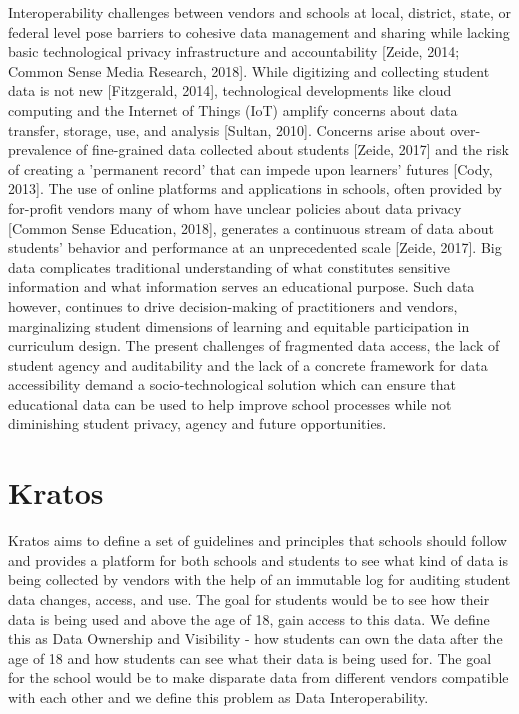 \documentclass{article}
\begin{document}
Interoperability challenges between vendors and schools at local, district, state, or federal level pose barriers to cohesive data management and sharing while lacking basic technological privacy infrastructure and accountability [Zeide, 2014; Common Sense Media Research, 2018]. While digitizing and collecting student data is not new [Fitzgerald, 2014], technological developments like cloud computing and the Internet of Things (IoT) amplify concerns about data transfer, storage, use, and analysis [Sultan, 2010].
\bigbreak
Concerns arise about over-prevalence of fine-grained data collected about students [Zeide, 2017] and the risk of creating a 'permanent record' that can impede upon learners' futures [Cody, 2013]. The use of online platforms and applications in schools, often provided by for-profit vendors many of whom have unclear policies about data privacy [Common Sense Education, 2018], generates a continuous stream of data about students' behavior and performance at an unprecedented scale [Zeide, 2017]. Big data complicates traditional understanding of what constitutes sensitive information and what information serves an educational purpose. Such data however, continues to drive decision-making of practitioners and vendors, marginalizing student dimensions of learning and equitable participation in curriculum design.
\bigbreak
The present challenges of fragmented data access, the lack of student agency and auditability and the lack of a concrete framework for data accessibility demand a socio-technological solution which can ensure that educational data can be used to help improve school processes while not diminishing student privacy, agency and future opportunities.

\section{Kratos}
Kratos aims to define a set of guidelines and principles that schools should follow and provides a platform for both schools and students to see what kind of data is being collected by vendors with the help of an immutable log for auditing student data changes, access, and use. The goal for students would be to see how their data is being used and above the age of 18, gain access to this data. We define this as Data Ownership and Visibility - how students can own the data after the age of 18 and how students can see what their data is being used for. The goal for the school would be to make disparate data from different vendors compatible with each other and we define this problem as Data Interoperability.
\end{document}

